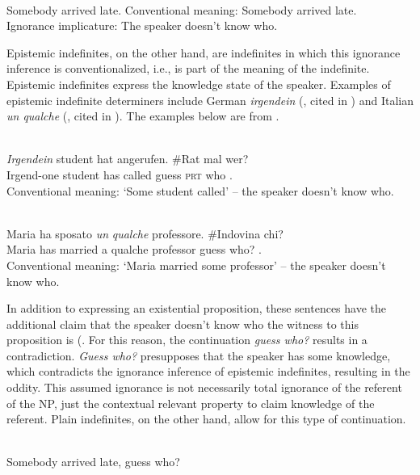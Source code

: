 \documentclass[output=paper,modfonts,nonflat,draftmode]{langsci/langscibook}
\begin{document}
\noindent\parbox{\textwidth}{\ea\label{owusu:ex25}\\
 Somebody arrived late.
\ea Conventional meaning: Somebody arrived late.\\
\ex Ignorance implicature: The speaker doesn't know who.
\z \z}


Epistemic indefinites, on the other hand, are indefinites in which this ignorance inference is conventionalized, i.e., is part of the meaning of the indefinite. Epistemic indefinites express the knowledge state of the speaker. Examples of epistemic indefinite determiners include German \emph{irgendein} (\citealt{Haspelmath1997,Kratzer2002a}, cited in \citealt{AloniPort2015}) and Italian \emph{un qualche}  (\citealt{Zamparelli2007}, cited in \citealt{AloniPort2015}). The examples below are from \citet{AloniPort2015}.

\ea\label{owusu:ex26}\\
 \gll\emph{Irgendein} student hat angerufen. \#Rat mal wer?  \\
     Irgend-one student has called guess \textsc{prt} who .\\
\glt Conventional meaning: `Some student called' – the speaker doesn’t know who.

\ex \label{owusu:ex28}\\
\gll Maria ha sposato \emph{un} \emph{qualche} professore. \#Indovina chi? \\
      Maria has married a qualche professor guess who? .\\
\glt Conventional meaning: `Maria married some professor' – the speaker doesn’t know who.
\z 

In addition to expressing an existential proposition, these sentences have the additional claim that the speaker doesn't know who the witness to this proposition is (\citet{AloniPort2015}. For this reason, the continuation \emph{guess who?} results in a contradiction. \emph{Guess who?} presupposes that the speaker has some knowledge, which contradicts the ignorance inference of epistemic indefinites, resulting in the oddity.  This assumed ignorance is not necessarily total ignorance of the referent of the NP,  just the contextual relevant property to claim knowledge of the referent. Plain indefinites, on the other hand, allow for this type of continuation.

  \ea\label{owusu:ex26:2}\\
 Somebody arrived late, guess who?
 \z 
 
\end{document}
